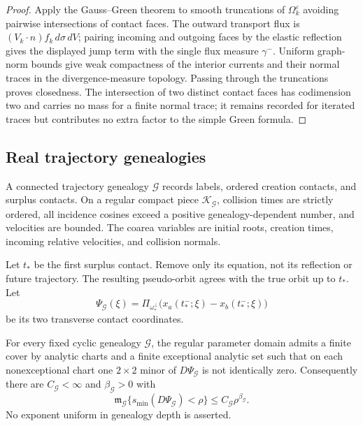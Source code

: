 \begin{proof}
Apply the Gauss--Green theorem to smooth truncations of
\(\Omega_k^\varepsilon\) avoiding pairwise intersections of contact faces.
The outward transport flux is
\((V_k\cdot n)f_k\,d\sigma\,dV\); pairing incoming and outgoing faces by the
elastic reflection gives the displayed jump term with the single flux
measure \(\gamma^-\).  Uniform graph-norm bounds give weak compactness of the
interior currents and their normal traces in the divergence-measure topology.
Passing through the truncations proves closedness.  The intersection of two
distinct contact faces has codimension two and carries no mass for a finite
normal trace; it remains recorded for iterated traces but contributes no
extra factor to the simple Green formula.
\end{proof}

\subsection{Real trajectory genealogies}

A connected trajectory genealogy \(\mathcal G\) records labels, ordered
creation contacts, and surplus contacts.  On a regular compact piece
\(\mathcal K_{\mathcal G}\), collision times are strictly ordered, all
incidence cosines exceed a positive genealogy-dependent number, and velocities
are bounded.  The coarea variables are initial roots, creation times, incoming
relative velocities, and collision normals.

Let \(t_*\) be the first surplus contact.  Remove only its equation, not its
reflection or future trajectory.  The resulting pseudo-orbit agrees with the
true orbit up to \(t_*\).  Let
\[
 \Psi_{\mathcal G}(\xi)
 =
 \Pi_{\omega_*^\perp}
 \bigl(x_a(t_*^-;\xi)-x_b(t_*^-;\xi)\bigr)
\]
be its two transverse contact coordinates.

\begin{lemma}
\label{lem:r14-b2-jacobi}
For every fixed cyclic genealogy \(\mathcal G\), the regular parameter domain
admits a finite cover by analytic charts and a finite exceptional analytic
set such that on each nonexceptional chart one \(2\times2\) minor of
\(D\Psi_{\mathcal G}\) is not identically zero.  Consequently there are
\(C_{\mathcal G}<\infty\) and \(\beta_{\mathcal G}>0\) with
\[
 \mathfrak m_{\mathcal G}
 \{s_{\min}(D\Psi_{\mathcal G})<\rho\}
 \le C_{\mathcal G}\rho^{\beta_{\mathcal G}} .
\]
No exponent uniform in genealogy depth is asserted.
\end{lemma}

